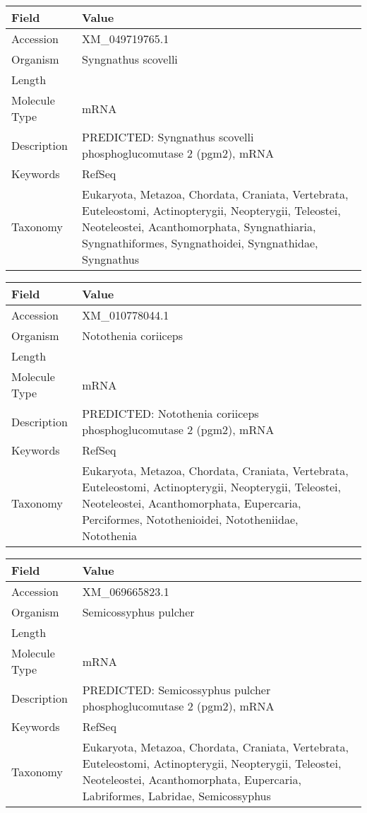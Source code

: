 \documentclass[10pt]{article}
\begin{document}
\vspace{1em}
{\footnotesize
\begin{longtable}{>{\raggedright\arraybackslash}p{4.5cm} >{\raggedright\arraybackslash}p{11.5cm}}
\textbf{Field} & \textbf{Value} \\
\hline
Accession & XM\_049719765.1 \\
Organism & Syngnathus scovelli \\
Length & 2317 \\
Molecule Type & mRNA \\
Description & PREDICTED: Syngnathus scovelli phosphoglucomutase 2 (pgm2), mRNA \\
Keywords & RefSeq \\
Taxonomy & Eukaryota, Metazoa, Chordata, Craniata, Vertebrata, Euteleostomi, Actinopterygii, Neopterygii, Teleostei, Neoteleostei, Acanthomorphata, Syngnathiaria, Syngnathiformes, Syngnathoidei, Syngnathidae, Syngnathus \\
\end{longtable}
}

\vspace{1em}
{\footnotesize
\begin{longtable}{>{\raggedright\arraybackslash}p{4.5cm} >{\raggedright\arraybackslash}p{11.5cm}}
\textbf{Field} & \textbf{Value} \\
\hline
Accession & XM\_010778044.1 \\
Organism & Notothenia coriiceps \\
Length & 2904 \\
Molecule Type & mRNA \\
Description & PREDICTED: Notothenia coriiceps phosphoglucomutase 2 (pgm2), mRNA \\
Keywords & RefSeq \\
Taxonomy & Eukaryota, Metazoa, Chordata, Craniata, Vertebrata, Euteleostomi, Actinopterygii, Neopterygii, Teleostei, Neoteleostei, Acanthomorphata, Eupercaria, Perciformes, Notothenioidei, Nototheniidae, Notothenia \\
\end{longtable}
}

\vspace{1em}
{\footnotesize
\begin{longtable}{>{\raggedright\arraybackslash}p{4.5cm} >{\raggedright\arraybackslash}p{11.5cm}}
\textbf{Field} & \textbf{Value} \\
\hline
Accession & XM\_069665823.1 \\
Organism & Semicossyphus pulcher \\
Length & 3222 \\
Molecule Type & mRNA \\
Description & PREDICTED: Semicossyphus pulcher phosphoglucomutase 2 (pgm2), mRNA \\
Keywords & RefSeq \\
Taxonomy & Eukaryota, Metazoa, Chordata, Craniata, Vertebrata, Euteleostomi, Actinopterygii, Neopterygii, Teleostei, Neoteleostei, Acanthomorphata, Eupercaria, Labriformes, Labridae, Semicossyphus \\
\end{longtable}
}
\end{document}
